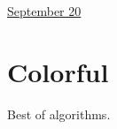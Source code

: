 \documentclass[11pt,letterpaper]{article}
\begin{document}
\href{run:2025-09-20-test-entry-2.tex}{\Huge September 20} %

\section{Colorful}
\begin{theorem}
Best of algorithms. 
\end{theorem}


 
\end{document}
